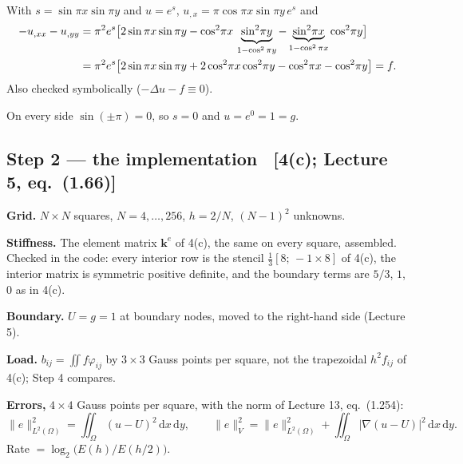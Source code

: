 \documentclass[11pt]{article}
\newcommand{\dxdy}{\,\mathrm{d}x\,\mathrm{d}y}
\newcommand{\norm}[1]{\lVert #1\rVert}
\newcommand{\abs}[1]{\lvert #1\rvert}
\newcommand{\Om}{\Omega}
\newcommand{\grad}{\nabla}
\newcommand{\lap}{\Delta}
\newcommand{\src}[1]{{\small\color{black!55}\textsf{[#1]}}}
\begin{document}
\begin{steps}
\item With $s=\sin\pi x\sin\pi y$ and $u=e^{s}$,
      $u_{,x}=\pi\cos\pi x\sin\pi y\,e^{s}$ and
\begin{align}
  -u_{,xx}-u_{,yy}
  &=\pi^{2}e^{s}\bigl[2\sin\pi x\sin\pi y
     -\cos^{2}\!\pi x\,\underbrace{\sin^{2}\!\pi y}_{1-\cos^{2}\pi y}
     -\underbrace{\sin^{2}\!\pi x}_{1-\cos^{2}\pi x}\cos^{2}\!\pi y\bigr]\notag\\
  &=\pi^{2}e^{s}\bigl[2\sin\pi x\sin\pi y+2\cos^{2}\!\pi x\cos^{2}\!\pi y
     -\cos^{2}\!\pi x-\cos^{2}\!\pi y\bigr]=f .\label{eq:lap}
\end{align}
      Also checked symbolically ($-\lap u-f\equiv0$).
\item On every side $\sin(\pm\pi)=0$, so $s=0$ and $u=e^{0}=1=g$.
\end{steps}

\subsection*{Step 2 --- the implementation \ \src{4(c); Lecture 5, eq.~(1.66)}}

\begin{steps}
\item \textbf{Grid.}  $N\times N$ squares, $N=4,\dots,256$, $h=2/N$,
      $(N-1)^{2}$ unknowns.
\item \textbf{Stiffness.}  The element matrix $\bm k^{e}$ of 4(c), the same on
      every square, assembled.  Checked in the code: every interior row is
      the stencil $\tfrac13[8;\,-1\times8]$ of 4(c), the interior matrix is
      symmetric positive definite, and the boundary terms are $5/3$, $1$, $0$
      as in 4(c).
\item \textbf{Boundary.}  $U=g=1$ at boundary nodes, moved to the right-hand
      side (Lecture 5).
\item \textbf{Load.}  $b_{ij}=\iint f\varphi_{ij}$ by $3\times3$ Gauss points
      per square, not the trapezoidal $h^{2}f_{ij}$ of 4(c); Step 4 compares.
\item \textbf{Errors,} $4\times4$ Gauss points per square, with the norm of
      Lecture 13, eq.~(1.254):
\begin{equation}\label{eq:norms}
  \norm{e}_{L^{2}(\Om)}^{2}=\iint_{\Om}(u-U)^{2}\dxdy,
  \qquad
  \norm{e}_{V}^{2}=\norm{e}_{L^{2}(\Om)}^{2}+\iint_{\Om}\abs{\grad(u-U)}^{2}\dxdy .
\end{equation}
      Rate $=\log_{2}\bigl(E(h)/E(h/2)\bigr)$.
\end{steps}
\end{document}
